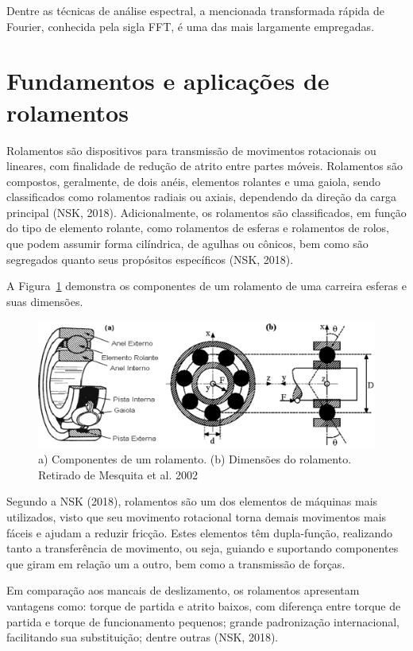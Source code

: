 \documentclass[
	12pt,				
	oneside,			
	a4paper,			
	english,			
	brazil,			
	]{abntex2ppgsi}
\begin{document}
Dentre as técnicas de análise espectral, a mencionada transformada rápida de Fourier, conhecida pela sigla FFT, é uma das mais largamente empregadas. 

\newpage
\section{\textbf{Fundamentos e aplicações de rolamentos}}
Rolamentos são dispositivos para transmissão de movimentos rotacionais ou lineares, com finalidade de redução de atrito entre partes móveis. Rolamentos são compostos, geralmente, de dois anéis, elementos rolantes e uma gaiola, sendo classificados como rolamentos radiais ou axiais, dependendo da direção da carga principal (NSK, 2018). Adicionalmente, os rolamentos são classificados, em função do tipo de elemento rolante, como rolamentos de esferas e rolamentos de rolos, que podem assumir forma cilíndrica, de agulhas ou cônicos, bem como são segregados quanto seus propósitos específicos (NSK, 2018).

A Figura~\ref{ComponentesRolamentos} demonstra os componentes de um rolamento de uma carreira esferas e suas dimensões. 

\begin{figure}[!htb]
\centering
\includegraphics[width=\textwidth,height=\textheight,keepaspectratio]{Figura1}
\caption{a) Componentes de um rolamento. (b) Dimensões do rolamento. Retirado de Mesquita et al. 2002}
\label{ComponentesRolamentos}
\end{figure}

Segundo a NSK (2018), rolamentos são um dos elementos de máquinas mais utilizados, visto que seu movimento rotacional torna demais movimentos mais fáceis e ajudam a reduzir fricção. Estes elementos têm dupla-função, realizando tanto a transferência de movimento, ou seja, guiando e suportando componentes que giram em relação um a outro, bem como a transmissão de forças.

Em comparação aos mancais de deslizamento, os rolamentos apresentam vantagens como: torque de partida e atrito baixos, com diferença entre torque de partida e torque de funcionamento pequenos; grande padronização internacional, facilitando sua substituição; dentre outras (NSK, 2018).
\end{document}
